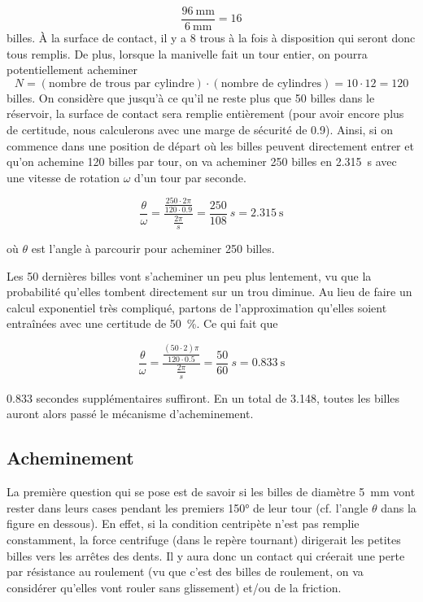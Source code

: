 \[\frac{\SI{96}{\milli\metre}}{\SI{6}{\milli\metre}} = \num{16}\]
billes. À la surface de contact, il y a \num{8} trous à la fois à disposition qui seront donc tous remplis. De plus, lorsque la manivelle fait un tour entier, on pourra potentiellement acheminer 
\[N = (\text{nombre de trous par cylindre}) \cdot (\text{nombre de cylindres}) = \num{10} \cdot \num{12} = \num{120}\]
billes.
On considère que jusqu'à ce qu'il ne reste plus que \num{50} billes dans le réservoir, la surface de contact sera remplie entièrement (pour avoir encore plus de certitude, nous calculerons avec une marge de sécurité de \num{0.9}).
Ainsi, si on commence dans une position de départ où les billes peuvent directement entrer et qu'on achemine \num{120} billes par tour, on va acheminer \num{250} billes en \SI{2.315}{\s} avec une vitesse de rotation $\omega$ d'un tour par seconde.

\[\frac{\theta}{\omega} = \frac{\frac{250 \cdot 2\pi}{120 \cdot 0.9}}{\frac{2\pi}{s}} = \frac{250}{108} \ s = \SI{2.315}{\s}\]

où $\theta$ est l'angle à parcourir pour acheminer 250 billes.

Les \num{50} dernières billes vont s'acheminer un peu plus lentement, vu que la probabilité qu'elles tombent directement sur un trou diminue. Au lieu de faire un calcul exponentiel très compliqué, partons de l'approximation qu'elles soient entraînées avec une certitude de \SI{50}{\percent}. Ce qui fait que

\[\frac{\theta}{\omega} = \frac{\frac{(50 \cdot 2)\pi}{120 \cdot 0.5}}{\frac{2 \pi}{s}} = \frac{50}{60} \ s = \SI{0.833}{\s}\]

\num{0.833} secondes supplémentaires suffiront.
En un total de \SI{3.148}{\sec}, toutes les billes auront alors passé le mécanisme d'acheminement.


\subsection{Acheminement}
La première question qui se pose est de savoir si les billes de diamètre \SI{5}{\mm} vont rester dans leurs cases pendant les premiers \ang{150} de leur tour (cf. l'angle $\theta$ dans la figure en dessous). En effet, si la condition centripète n'est pas remplie constamment, la force centrifuge (dans le repère tournant) dirigerait les petites billes vers les arrêtes des dents. Il y aura donc un contact qui créerait une perte par résistance au roulement (vu que c'est des billes de roulement, on va considérer qu'elles vont rouler sans glissement) et/ou de la friction. 

